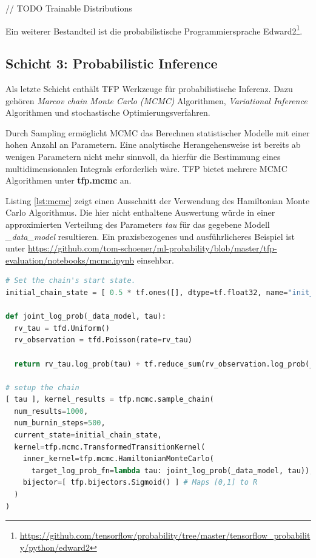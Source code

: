 \documentclass[12pt]{article}
\begin{document}
// TODO Trainable Distributions


Ein weiterer Bestandteil ist die probabilistische Programmiersprache Edward2\footnote{\url{https://github.com/tensorflow/probability/tree/master/tensorflow_probability/python/edward2}}.

\subsection{Schicht 3: Probabilistic Inference}
\label{sec:layer3}
Als letzte Schicht enthält TFP Werkzeuge für probabilistische Inferenz. Dazu gehören \textit{Marcov chain Monte Carlo (MCMC)} Algorithmen, \textit{Variational Inference} Algorithmen und stochastische Optimierungsverfahren. 

Durch Sampling ermöglicht MCMC das Berechnen statistischer Modelle mit einer hohen Anzahl an Parametern. Eine analytische Herangehensweise ist bereits ab wenigen Parametern nicht mehr sinnvoll, da hierfür die Bestimmung eines multidimensionalen Integrals erforderlich wäre. TFP bietet mehrere MCMC Algorithmen unter \textbf{tfp.mcmc} an. 

Listing \ref{lst:mcmc} zeigt einen Ausschnitt der Verwendung des Hamiltonian Monte Carlo Algorithmus. Die hier nicht enthaltene Auswertung würde in einer approximierten Verteilung des Parameters \textit{tau} für das gegebene Modell \textit{\_data\_model} resultieren. Ein praxisbezogenes und ausführlicheres Beispiel ist unter \url{https://github.com/tom-schoener/ml-probability/blob/master/tfp-evaluation/notebooks/mcmc.ipynb} einsehbar.

\begin{lstlisting}[language=Python, caption={Verwendung des Hamiltonian Monte Carlo Algorithmus (gekürzt)}, label={lst:mcmc}]
# Set the chain's start state.
initial_chain_state = [ 0.5 * tf.ones([], dtype=tf.float32, name="init_tau") ]

def joint_log_prob(_data_model, tau):
  rv_tau = tfd.Uniform()
  rv_observation = tfd.Poisson(rate=rv_tau)

  return rv_tau.log_prob(tau) + tf.reduce_sum(rv_observation.log_prob(_data_model))

# setup the chain
[ tau ], kernel_results = tfp.mcmc.sample_chain(
  num_results=1000,
  num_burnin_steps=500,
  current_state=initial_chain_state,
  kernel=tfp.mcmc.TransformedTransitionKernel(
    inner_kernel=tfp.mcmc.HamiltonianMonteCarlo(
      target_log_prob_fn=lambda tau: joint_log_prob(_data_model, tau)),
    bijector=[ tfp.bijectors.Sigmoid() ] # Maps [0,1] to R  
  )
)
\end{lstlisting}
\end{document}
